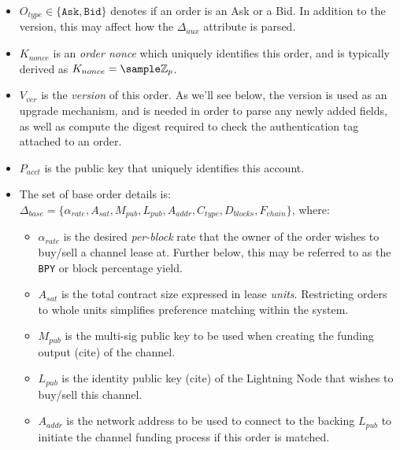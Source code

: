 \documentclass[10pt,a4paper]{article}
\theoremstyle{definition}
\begin{document}
\begin{itemize}
    \item $O_{type} \in \{\texttt{Ask}, \texttt{Bid}\}$ denotes if an order is
        an Ask or a Bid. In addition to the version, this may affect how the
        $\Delta_{aux}$ attribute is parsed.

    \item $K_{nonce}$ is an \emph{order nonce} which uniquely identifies this
        order, and is typically derived as $K_{nonce} = \sample
        \mathbb{Z}_{p}$.

    \item $V_{ver}$ is the \emph{version} of this order. As we'll see below,
        the version is used as an upgrade mechanism, and is needed in order to
        parse any newly added fields, as well as compute the digest required to
        check the authentication tag attached to an order.

    \item $P_{acct}$ is the public key that uniquely identifies this account.

    \item The set of base order details is: \\ $\Delta_{base} = \{
        \alpha_{rate}, A_{sat}, M_{pub}, L_{pub}, A_{addr}, C_{type},
    D_{blocks}, F_{chain} \}$, where:

    \begin{itemize}

        \item $\alpha_{rate}$ is the desired \emph{per-block} rate that the owner
            of the order wishes to buy/sell a channel lease at. Further below, this
            may be referred to as the \texttt{BPY} or block percentage yield.

        \item $A_{sat}$ is the total contract size expressed in lease \emph{units}.
            Restricting orders to whole units simplifies preference matching within
            the system.

        \item $M_{pub}$ is the multi-sig public key to be used when creating
            the funding output (cite) of the channel. %

        \item $L_{pub}$ is the identity public key (cite) of the Lightning
            Node that wishes to buy/sell this channel.

        \item $A_{addr}$ is the network address to be used to connect to the
            backing $L_{pub}$ to initiate the channel funding process if this
            order is matched. %


\end{itemize}
\end{itemize}
\end{document}
